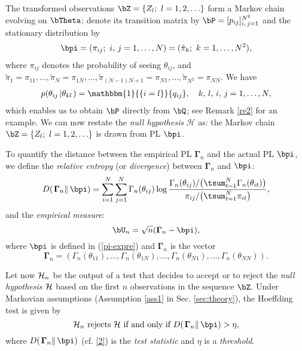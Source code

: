 \documentclass[10pt, twocolumn]{IEEEtran}
\begin{document}
The transformed observations $\bZ = \{ {{Z_l};~l =
    1,2, \ldots } \}$ form a Markov chain evolving on
${\bTheta}$; denote its transition matrix by $\bP = [ {{p_{ij}}}
]_{i,\,j = 1}^{{N^2}}$ and the stationary distribution by
\begin{align}
{{\bpi}} = ( {{\pi _{ij}}};~i,\,j = 1, \ldots, N )
= ( {{{\tilde {\pi}}_k}};~k = 1, \ldots, N^2 ),   \label{pi-expre}
\end{align} 
where
${{\pi _{ij}}}$ denotes the probability of seeing $\theta_{ij}$, and
${{\tilde {\pi}}_1} = {{\pi}_{11}}, \ldots, {{\tilde {\pi}}_N} =
{{\pi}_{1N}}, \ldots, {{\tilde {\pi}}_{\left( {N - 1} \right)N + 1}}
= {{\pi}_{N1}}, \ldots, {{\tilde {\pi}}_{{N^2}}} = {{\pi}_{NN}}$.
We have \cite{dembo1998large}
\begin{align}
p( {{\theta_{ij}}\left| {{\theta_{kl}}} \right.} ) =
\mathbbm{1}{\{ {i = l} \}}{q_{ij}}, \quad k,\,l,\,i,\,j = 1,
\ldots ,N, \label{QtoP}
\end{align}  
which enables us to obtain $\bP$ directly from $\bQ$; see Remark \ref{re2} for
an example.  We can now restate the \textit{null hypothesis} $\mathcal{H}$ as:
the Markov chain $\bZ = \{ {{Z_l};~l = 1,2, \ldots }\}$ is drawn from PL
$\bpi$.

To quantify the distance between the empirical PL $\boldsymbol{\Gamma} _n$ and
the actual PL ${\bpi}$, we define the \textit{relative entropy} (or
\textit{divergence}) between ${\boldsymbol{\Gamma} _n}$ and ${{\bpi} }$: 
\begin{equation}
  D( {\left. \boldsymbol{\Gamma} _n \right\| \bpi }) = 
 \sum_{i = 1}^N \sum_{j = 1}^N \Gamma_n(\theta_{ij}) \log 
   \frac{\Gamma _n(\theta_{ij})/
            \big( \tsum_{t = 1}^N \Gamma _n(\theta_{it})\big)} 
{\pi _{ij}/ \big(\tsum_{t = 1}^N \pi _{it} \big)},
\label{2}
\end{equation}
and the \textit{empirical measure}:
\begin{equation}
{\bU_n} = \sqrt n ( {{\boldsymbol{\Gamma} _n} - {\bpi} } ),
\label{2.0}
\end{equation}
where $\bpi$ is defined in (\ref{pi-expre}) and $\boldsymbol{\Gamma}_n$ is
  the vector
\[ {\boldsymbol{\Gamma} _n} = ({{\Gamma _n}( {{\theta_{11}}} )},
\ldots, {{\Gamma _n}( {{\theta_{1N}}} )}, \ldots, {{\Gamma
    _n} ( {{\theta_{N1}}} )}, \ldots, {{\Gamma _n}(
  {{\theta_{NN}}} )}).\]

Let now ${{\cal{H}}_n}$ be the output of a test that decides to accept
or to reject the \textit{null hypothesis} $\cal H$ based on the first
$n$ observations in the sequence $\bZ$.  Under Markovian assumptions
(Assumption \ref{ass1} in Sec. \ref{sec:theory}), the Hoeffding test
\cite{dembo1998large} is given by
\begin{equation}
{{\cal{H}}_n} ~\text{rejects}~ {\cal{H}} ~\text{if and only if}~ D( {\left. {{\boldsymbol{\Gamma} _n}} \right\|{{\bpi}}}) > \eta, \label{333}
\end{equation}
where $D( {\left. {{\boldsymbol{\Gamma} _n}} \right\|{{\bpi}}})$
(cf. \eqref{2}) is the \textit{test statistic} and $\eta$ is a
\textit{threshold}. 
\end{document}
